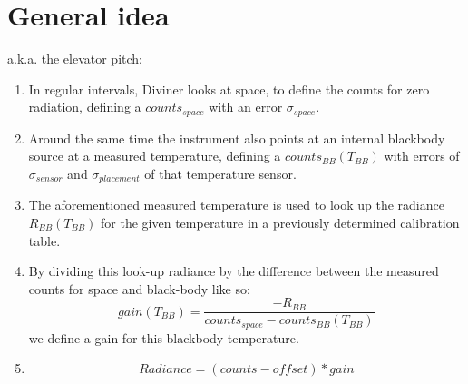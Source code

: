 \section{General idea}
a.k.a. the elevator pitch:

\begin{enumerate}
\item In regular intervals, Diviner looks at space, to define the counts for zero radiation, defining a $counts_{space}$ with an error $\sigma_{space}$. 
\item Around the same time the instrument also points at an internal blackbody source at a measured temperature, defining a $counts_{BB}\left(T_{BB}\right)$ with errors of $\sigma_{sensor}$ and $\sigma_{placement}$ of that temperature sensor.
\item The aforementioned measured temperature is used to look up the radiance $R_{BB}\left(T_{BB}\right)$ for the given temperature in a previously determined calibration table.
\item By dividing this look-up radiance by the difference between the measured counts for space and black-body like so: $$ gain\left(T_{BB}\right) = \frac{-R_{BB}}{counts_{space} - counts_{BB}\left(T_{BB}\right)} $$ we define a gain for this blackbody temperature.
\item $$ Radiance = \left(counts - offset\right) * gain $$
\end{enumerate}